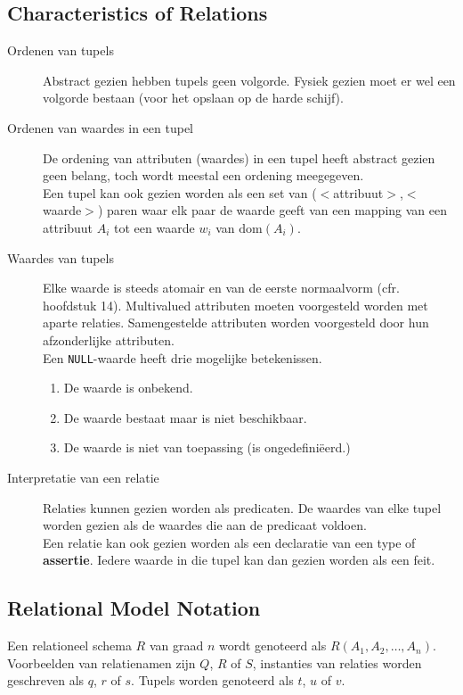 \subsection{Characteristics of Relations}
\begin{description}
	\item[Ordenen van tupels] Abstract gezien hebben tupels geen volgorde. Fysiek gezien moet er wel een volgorde bestaan (voor het opslaan op de harde schijf).
	\item[Ordenen van waardes in een tupel] De ordening van attributen (waardes) in een tupel heeft abstract gezien geen belang, toch wordt meestal een ordening meegegeven.\\
	Een tupel kan ook gezien worden als een set van ($<$attribuut$>$,$<$waarde$>$) paren waar elk paar de waarde geeft van een mapping van een attribuut $A_i$ tot een waarde $w_i$ van $\text{dom}(A_i)$.
	\item[Waardes van tupels] Elke waarde is steeds atomair en van de eerste normaalvorm (cfr. hoofdstuk 14). Multivalued attributen moeten voorgesteld worden met aparte relaties. Samengestelde attributen worden voorgesteld door hun afzonderlijke attributen.\\
	Een \texttt{NULL}-waarde heeft drie mogelijke betekenissen. 
	\begin{enumerate}
		\item De waarde is onbekend.
		\item De waarde bestaat maar is niet beschikbaar.
		\item De waarde is niet van toepassing (is ongedefini\"eerd.)
	\end{enumerate}
	\item[Interpretatie van een relatie] Relaties kunnen gezien worden als predicaten. De waardes van elke tupel worden gezien als de waardes die aan de predicaat voldoen.\\
Een relatie kan ook gezien worden als een declaratie van een type of \textbf{assertie}. Iedere waarde in die tupel kan dan gezien worden als een feit.
\end{description}

\subsection{Relational Model Notation}
Een relationeel schema $R$ van graad $n$ wordt genoteerd als $R(A_1, A_2, \dots, A_n)$. Voorbeelden van relatienamen zijn $Q$, $R$ of $S$, instanties van relaties worden geschreven als $q$, $r$ of $s$. Tupels worden genoteerd als $t$, $u$ of $v$.

